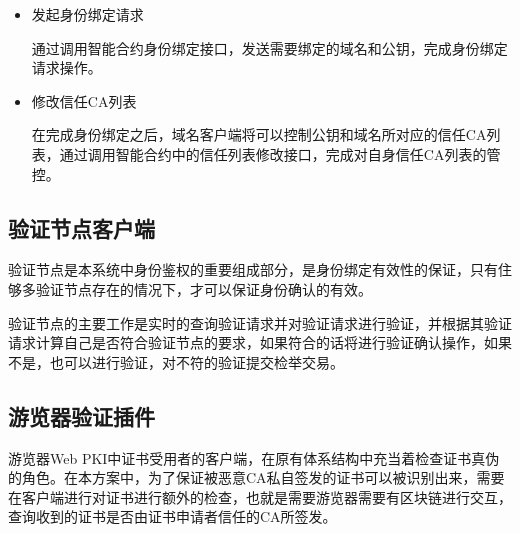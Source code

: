 \begin{itemize}
	\item 

	发起身份绑定请求

	通过调用智能合约身份绑定接口，发送需要绑定的域名和公钥，完成身份绑定请求操作。

	\item 

	修改信任CA列表

	在完成身份绑定之后，域名客户端将可以控制公钥和域名所对应的信任CA列表，通过调用智能合约中的信任列表修改接口，完成对自身信任CA列表的管控。


\end{itemize}

\subsection{验证节点客户端}

验证节点是本系统中身份鉴权的重要组成部分，是身份绑定有效性的保证，只有住够多验证节点存在的情况下，才可以保证身份确认的有效。

验证节点的主要工作是实时的查询验证请求并对验证请求进行验证，并根据其验证请求计算自己是否符合验证节点的要求，如果符合的话将进行验证确认操作，如果不是，也可以进行验证，对不符的验证提交检举交易。


\subsection{游览器验证插件}


游览器Web PKI中证书受用者的客户端，在原有体系结构中充当着检查证书真伪的角色。在本方案中，为了保证被恶意CA私自签发的证书可以被识别出来，需要在客户端进行对证书进行额外的检查，也就是需要游览器需要有区块链进行交互，查询收到的证书是否由证书申请者信任的CA所签发。



